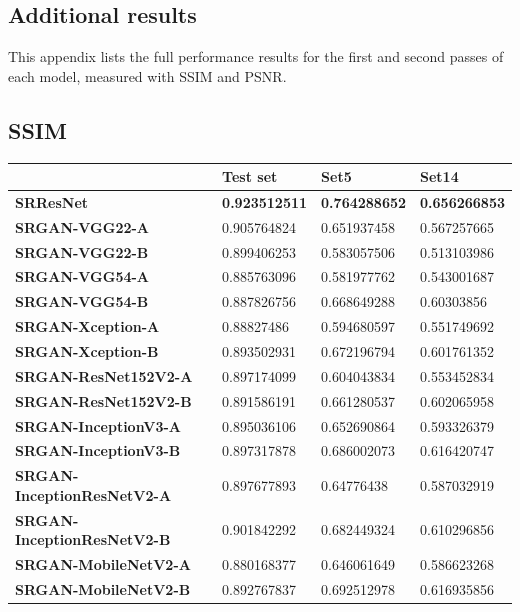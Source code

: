 \begin{appendices}
\chapter{Additional results}
This appendix lists the full performance results for the first and second passes of each model, measured with SSIM and PSNR.\@
\section{SSIM}
\begin{table}[h!]
    \centering
    \begin{tabular}{llll}
        \toprule
        \textbf{} & \textbf{Test set} & \textbf{Set5} & \textbf{Set14} \\
        \midrule
        \textbf{SRResNet} & \textbf{0.923512511} & \textbf{0.764288652} & \textbf{0.656266853} \\ 
        \textbf{SRGAN-VGG22-A} & 0.905764824 & 0.651937458 & 0.567257665 \\ 
        \textbf{SRGAN-VGG22-B} & 0.899406253 & 0.583057506 & 0.513103986 \\ 
        \textbf{SRGAN-VGG54-A} & 0.885763096 & 0.581977762 & 0.543001687 \\ 
        \textbf{SRGAN-VGG54-B} & 0.887826756 & 0.668649288 & 0.60303856 \\ 
        \textbf{SRGAN-Xception-A} & 0.88827486 & 0.594680597 & 0.551749692 \\ 
        \textbf{SRGAN-Xception-B} & 0.893502931 & 0.672196794 & 0.601761352 \\ 
        \textbf{SRGAN-ResNet152V2-A} & 0.897174099 & 0.604043834 & 0.553452834 \\ 
        \textbf{SRGAN-ResNet152V2-B} & 0.891586191 & 0.661280537 & 0.602065958 \\ 
        \textbf{SRGAN-InceptionV3-A} & 0.895036106 & 0.652690864 & 0.593326379 \\ 
        \textbf{SRGAN-InceptionV3-B} & 0.897317878 & 0.686002073 & 0.616420747 \\ 
        \textbf{SRGAN-InceptionResNetV2-A} & 0.897677893 & 0.64776438 & 0.587032919 \\ 
        \textbf{SRGAN-InceptionResNetV2-B} & 0.901842292 & 0.682449324 & 0.610296856 \\ 
        \textbf{SRGAN-MobileNetV2-A} & 0.880168377 & 0.646061649 & 0.586623268 \\ 
        \textbf{SRGAN-MobileNetV2-B} & 0.892767837 & 0.692512978 & 0.616935856 \\ 

\end{tabular}
\end{table}
\end{appendices}

